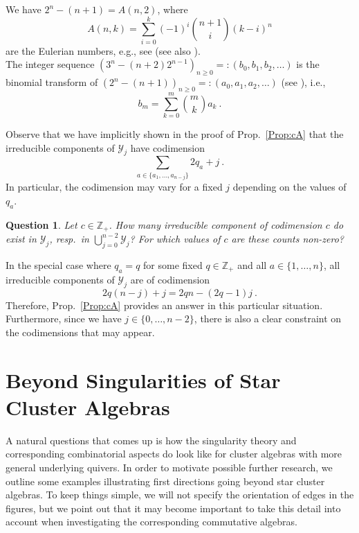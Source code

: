 \documentclass[letter,11pt]{amsart}
\newcommand{\ZZ}{\ensuremath{\mathbb{Z}}}
\theoremstyle{theorem}
\newtheorem{Qu}[Thm]{Question}
\theoremstyle{definition}
\numberwithin{equation}{section}
\begin{document}
We have $ 2^n - ( n + 1 ) =  A(n,2) $, where 
	\[  
		A(n,k) = \sum_{i=0}^k (-1)^i \binom{n+1}{i} (k-i)^n 
	\] 
are the Eulerian numbers,
e.g., see \cite[Thm.~C, p.~243]{Comtet}
(see also \cite[A000295]{OEIS}).
\\
The integer sequence 
$ ( 3^n  - (n + 2) 2^{n - 1} )_{n \geq 0 } =: (b_0, b_1, b_2, \ldots ) $  
is the binomial transform of $ ( 2^n - ( n + 1 ) )_{n\geq 0}  =: (a_0, a_1, a_2, \ldots ) $ 
(see \cite[A066810]{OEIS}),
i.e.,
\[  
b_m = \sum_{k=0}^m  \binom{m}{k} a_k 
\ .
\]




Observe that we have implicitly shown in the proof of Prop.~\ref{Prop:cA} that the irreducible components of $ {\mathcal Y}_j $ have codimension
\[
\sum_{a \in \{ a_1, \ldots, a_{n-j} \} } 2 q_{a} + j 
\ .
\]
In particular, the codimension may vary for a fixed $ j $ depending on the values of $ q_a $. 

\begin{Qu}
	Let $ c \in \ZZ_+ $.
	How many irreducible component of codimension $ c $ do exist in $ {\mathcal Y}_j $, resp.~in $ \bigcup_{j=0}^{n-2} {\mathcal Y}_j $? 
	For which values of $ c $ are these counts non-zero? 
\end{Qu}


In the special case where $ q_a = q $ for some fixed $ q \in \ZZ_+ $ and all $ a \in \{ 1, \ldots, n \} $, 
all irreducible components of $ {\mathcal Y}_j $ are of codimension 
\[  
2q(n-j) + j = 2 qn - (2q-1) j  \ . 
\]
Therefore, Prop.~\ref{Prop:cA} provides an answer in this particular situation. 
Furthermore, since we have $ j \in \{ 0, \ldots, n- 2\} $, there is also a clear constraint on the codimensions that may appear. 









\section{Beyond Singularities of Star Cluster Algebras}
\label{Sec:beyond}

A natural questions that comes up is how the singularity theory and corresponding combinatorial aspects do look like for cluster algebras with more general underlying quivers. 
In order to motivate possible further research, we outline some examples illustrating first directions going beyond star cluster algebras.
To keep things simple, we will not specify the orientation of edges in the figures, but we point out that it may become important to take this detail into account when investigating the corresponding commutative algebras. 
\end{document}
